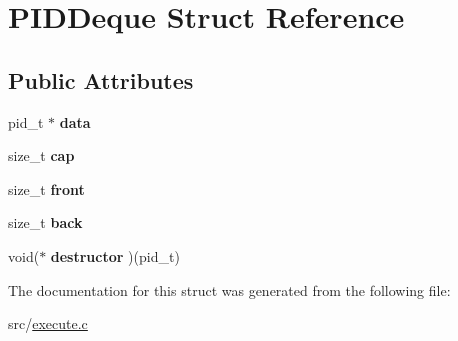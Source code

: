 \hypertarget{structPIDDeque}{}\section{P\+I\+D\+Deque Struct Reference}
\label{structPIDDeque}
\subsection*{Public Attributes}
\begin{DoxyCompactItemize}
\item 
pid\+\_\+t $\ast$ {\bfseries data}\hypertarget{structPIDDeque_a88d4263bc3f66f08b98dd6295b25f48b}{}\label{structPIDDeque_a88d4263bc3f66f08b98dd6295b25f48b}

\item 
size\+\_\+t {\bfseries cap}\hypertarget{structPIDDeque_a9afaeedf7ee459f136f524b48aebc334}{}\label{structPIDDeque_a9afaeedf7ee459f136f524b48aebc334}

\item 
size\+\_\+t {\bfseries front}\hypertarget{structPIDDeque_a68b24942e3c835d093a802e1c03eb0ca}{}\label{structPIDDeque_a68b24942e3c835d093a802e1c03eb0ca}

\item 
size\+\_\+t {\bfseries back}\hypertarget{structPIDDeque_aacd460ad7ad7b31f98aa844c40f3466e}{}\label{structPIDDeque_aacd460ad7ad7b31f98aa844c40f3466e}

\item 
void($\ast$ {\bfseries destructor} )(pid\+\_\+t)\hypertarget{structPIDDeque_a97c81be6ef88ae43454c77092aa829a4}{}\label{structPIDDeque_a97c81be6ef88ae43454c77092aa829a4}

\end{DoxyCompactItemize}


The documentation for this struct was generated from the following file\+:\begin{DoxyCompactItemize}
\item 
src/\hyperlink{execute_8c}{execute.\+c}\end{DoxyCompactItemize}

